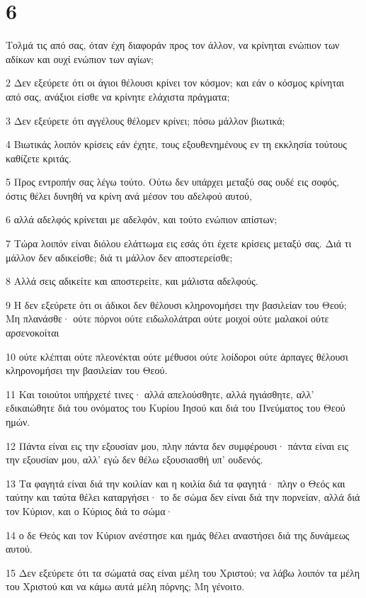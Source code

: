 \chapter{6}

\par Τολμά τις από σας, όταν έχη διαφοράν προς τον άλλον, να κρίνηται ενώπιον των αδίκων και ουχί ενώπιον των αγίων;
\par 2 Δεν εξεύρετε ότι οι άγιοι θέλουσι κρίνει τον κόσμον; και εάν ο κόσμος κρίνηται από σας, ανάξιοι είσθε να κρίνητε ελάχιστα πράγματα;
\par 3 Δεν εξεύρετε ότι αγγέλους θέλομεν κρίνει; πόσω μάλλον βιωτικά;
\par 4 Βιωτικάς λοιπόν κρίσεις εάν έχητε, τους εξουθενημένους εν τη εκκλησία τούτους καθίζετε κριτάς.
\par 5 Προς εντροπήν σας λέγω τούτο. Ούτω δεν υπάρχει μεταξύ σας ουδέ εις σοφός, όστις θέλει δυνηθή να κρίνη ανά μέσον του αδελφού αυτού,
\par 6 αλλά αδελφός κρίνεται με αδελφόν, και τούτο ενώπιον απίστων;
\par 7 Τώρα λοιπόν είναι διόλου ελάττωμα εις εσάς ότι έχετε κρίσεις μεταξύ σας. Διά τι μάλλον δεν αδικείσθε; διά τι μάλλον δεν αποστερείσθε;
\par 8 Αλλά σεις αδικείτε και αποστερείτε, και μάλιστα αδελφούς.
\par 9 Η δεν εξεύρετε ότι οι άδικοι δεν θέλουσι κληρονομήσει την βασιλείαν του Θεού; Μη πλανάσθε· ούτε πόρνοι ούτε ειδωλολάτραι ούτε μοιχοί ούτε μαλακοί ούτε αρσενοκοίται
\par 10 ούτε κλέπται ούτε πλεονέκται ούτε μέθυσοι ούτε λοίδοροι ούτε άρπαγες θέλουσι κληρονομήσει την βασιλείαν του Θεού.
\par 11 Και τοιούτοι υπήρχετέ τινες· αλλά απελούσθητε, αλλά ηγιάσθητε, αλλ' εδικαιώθητε διά του ονόματος του Κυρίου Ιησού και διά του Πνεύματος του Θεού ημών.
\par 12 Πάντα είναι εις την εξουσίαν μου, πλην πάντα δεν συμφέρουσι· πάντα είναι εις την εξουσίαν μου, αλλ' εγώ δεν θέλω εξουσιασθή υπ' ουδενός.
\par 13 Τα φαγητά είναι διά την κοιλίαν και η κοιλία διά τα φαγητά· πλην ο Θεός και ταύτην και ταύτα θέλει καταργήσει· το δε σώμα δεν είναι διά την πορνείαν, αλλά διά τον Κύριον, και ο Κύριος διά το σώμα·
\par 14 ο δε Θεός και τον Κύριον ανέστησε και ημάς θέλει αναστήσει διά της δυνάμεως αυτού.
\par 15 Δεν εξεύρετε ότι τα σώματά σας είναι μέλη του Χριστού; να λάβω λοιπόν τα μέλη του Χριστού και να κάμω αυτά μέλη πόρνης; Μη γένοιτο.
